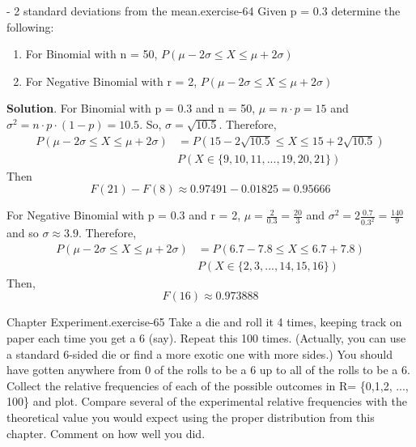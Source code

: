 \documentclass[10pt,]{book}
\numberwithin{equation}{section}
\begin{document}
\begin{inlineexercise}{- 2 standard deviations from the mean.}{exercise-64}%
\hypertarget{p-938}{}%
Given p = 0.3 determine the following: \leavevmode%
\begin{enumerate}
\item\hypertarget{li-287}{}For Binomial with n = 50, \(P(\mu - 2\sigma \le X \le \mu + 2\sigma)\)%
\item\hypertarget{li-288}{}For Negative Binomial with r = 2, \(P(\mu - 2\sigma \le X \le \mu + 2\sigma)\)%
\end{enumerate}
%
\textbf{Solution}.\quad%
\hypertarget{p-939}{}%
For Binomial with p = 0.3 and n = 50, \(\mu = n \cdot p = 15\) and \(\sigma^2 = n \cdot p \cdot (1-p) = 10.5\).  So, \(\sigma = \sqrt{10.5}\).  Therefore,%
\begin{align*}
P(\mu - 2\sigma \le X \le \mu + 2\sigma) & = P(15 - 2 \sqrt{10.5} \le X \le 15 + 2 \sqrt{10.5})\\
& P( X \in \{9, 10, 11, ... , 19, 20, 21 \} )
\end{align*}
Then%
\begin{equation*}
F(21) - F(8) \approx 0.97491 - 0.01825 = 0.95666 
\end{equation*}
%
\par
\hypertarget{p-940}{}%
For Negative Binomial with p = 0.3 and r = 2, \(\mu = \frac{2}{0.3} = \frac{20}{3}\) and \(\sigma^2 = 2 \frac{0.7}{0.3^2} = \frac{140}{9}\) and so \(\sigma \approx 3.9\).  Therefore,%
\begin{align*}
P(\mu - 2\sigma \le X \le \mu + 2\sigma) & = P(6.7 - 7.8 \le X \le 6.7 + 7.8)\\
& P( X \in \{2, 3, ... , 14, 15, 16 \} )
\end{align*}
Then,%
\begin{equation*}
F(16) \approx 0.973888
\end{equation*}
%
\end{inlineexercise}
%
\par
\hypertarget{p-941}{}%
\begin{inlineexercise}{Chapter Experiment.}{exercise-65}%
\hypertarget{p-942}{}%
Take a die and roll it 4 times, keeping track on paper each time you get a 6 (say).  Repeat this 100 times. (Actually, you can use a standard 6-sided die or find a more exotic one with more sides.)  You should have gotten anywhere from 0 of the rolls to be a 6 up to all of the rolls to be a 6.  Collect the relative frequencies of each of the possible outcomes in R= \{0,1,2, ..., 100\} and plot.  Compare several of the experimental relative frequencies with the theoretical value you would expect using the proper distribution from this chapter. Comment on how well you did.%
\end{inlineexercise}
%
%
%
\typeout{************************************************}
\typeout{************************************************}
%
\end{document}
